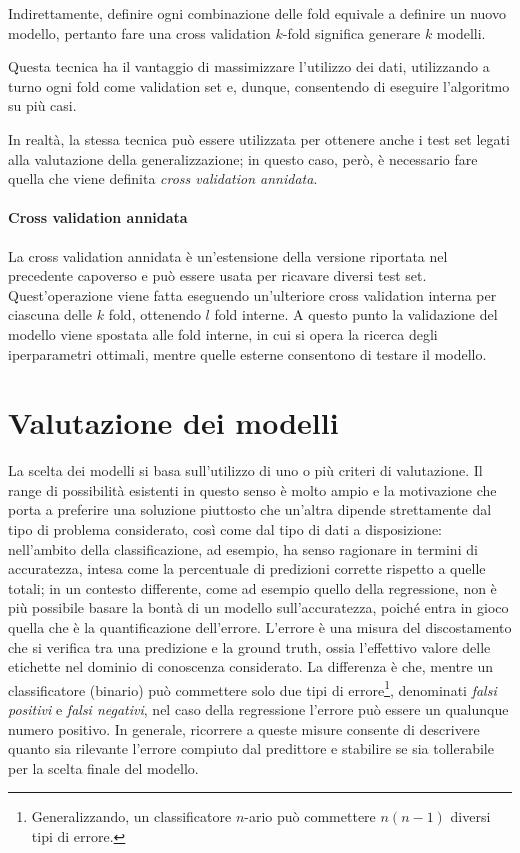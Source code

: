 \documentclass[12pt]{report}
\theoremstyle{definition}
\begin{document}
Indirettamente, definire ogni combinazione delle fold equivale a definire un nuovo modello, pertanto fare una cross validation $k$-fold significa generare $k$ modelli.

Questa tecnica ha il vantaggio di massimizzare l'utilizzo dei dati, utilizzando a turno ogni fold come validation set e, dunque, consentendo di eseguire l'algoritmo su più casi.

In realtà, la stessa tecnica può essere utilizzata per ottenere anche i test set legati alla valutazione della generalizzazione; in questo caso, però, è necessario fare quella che viene definita \textit{cross validation annidata}.

\paragraph{Cross validation annidata}
La cross validation annidata è un'estensione della versione riportata nel precedente capoverso e può essere usata per ricavare diversi test set. Quest'operazione viene fatta eseguendo un'ulteriore cross validation interna per ciascuna delle $k$ fold, ottenendo $l$ fold interne. A questo punto la validazione del modello viene spostata alle fold interne, in cui si opera la ricerca degli iperparametri ottimali, mentre quelle esterne consentono di testare il modello.

\section{Valutazione dei modelli}\label{evaluation}
La scelta dei modelli si basa sull'utilizzo di uno o più criteri di valutazione. Il range di possibilità esistenti in questo senso è molto ampio e la motivazione che porta a preferire una soluzione piuttosto che un'altra dipende strettamente dal tipo di problema considerato, così come dal tipo di dati a disposizione: nell'ambito della classificazione, ad esempio, ha senso ragionare in termini di accuratezza, intesa come la percentuale di predizioni corrette rispetto a quelle totali; in un contesto differente, come ad esempio quello della regressione, non è più possibile basare la bontà di un modello sull'accuratezza, poiché entra in gioco quella che è la quantificazione dell'errore. L'errore è una misura del discostamento che si verifica tra una predizione e la ground truth, ossia l'effettivo valore delle etichette nel dominio di conoscenza considerato.
La differenza è che, mentre un classificatore (binario) può commettere solo due tipi di errore\footnote{Generalizzando, un classificatore $n$-ario può commettere $n(n-1)$ diversi tipi di errore.}, denominati \textit{falsi positivi} e \textit{falsi negativi}, nel caso della regressione l'errore può essere un qualunque numero positivo.
In generale, ricorrere a queste misure consente di descrivere quanto sia rilevante l'errore compiuto dal predittore e stabilire se sia tollerabile per la scelta finale del modello.
\end{document}
